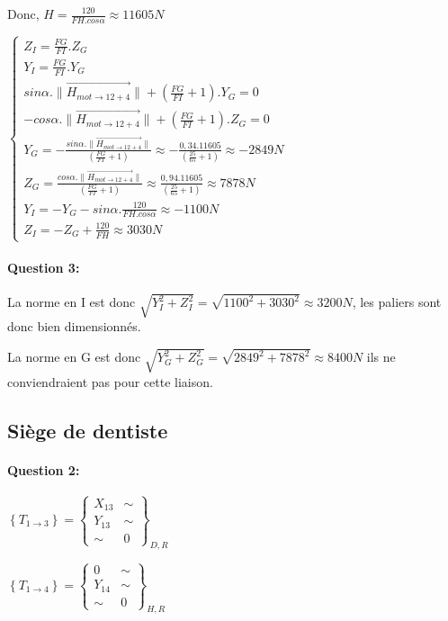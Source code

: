 Donc, $H=\frac{120}{FH.cos\alpha}\approx11605N$

$\left\{\begin{array}{l}
Z_I=\frac{FG}{FI}.Z_G \\
Y_I=\frac{FG}{FI}.Y_G \\
sin\alpha.\|\overrightarrow{H_{mot\rightarrow 12+4}}\|+(\frac{FG}{FI}+1).Y_G=0 \\
-cos\alpha.\|\overrightarrow{H_{mot\rightarrow 12+4}}\|+(\frac{FG}{FI}+1).Z_G=0 \\
Y_G=-\frac{sin\alpha.\|\overrightarrow{H_{mot\rightarrow 12+4}}\|}{(\frac{FG}{FI}+1)}\approx-\frac{0,34.11605}{(\frac{25}{65}+1)}\approx-2849N\\
Z_G=\frac{cos\alpha.\|\overrightarrow{H_{mot\rightarrow 12+4}}\|}{(\frac{FG}{FI}+1)}\approx\frac{0,94.11605}{(\frac{25}{65}+1)}\approx 7878N\\
Y_I=-Y_G-sin\alpha.\frac{120}{FH.cos\alpha}\approx -1100N \\
Z_I=-Z_G+\frac{120}{FH}\approx 3030N
\end{array}\right.$

\paragraph{Question 3:}

La norme en I est donc $\sqrt{Y_I^2+Z_I^2}=\sqrt{1100^2+3030^2}\approx 3200N$, les paliers sont donc bien dimensionnés.

La norme en G est donc $\sqrt{Y_G^2+Z_G^2}=\sqrt{2849^2+7878^2}\approx 8400N$
ils ne conviendraient pas pour cette liaison.

\subsection{Siège de dentiste}

\paragraph{Question 2:}

$\left\{T_{1\rightarrow 3}\right\}=\left\{
\begin{array}{cc}
X_{13} & \sim \\
Y_{13} & \sim \\
\sim & 0
\end{array}
\right\}_{D,R}$

$\left\{T_{1\rightarrow 4}\right\}=\left\{
\begin{array}{cc}
0 & \sim \\
Y_{14} & \sim \\
\sim & 0
\end{array}
\right\}_{H,R}$

